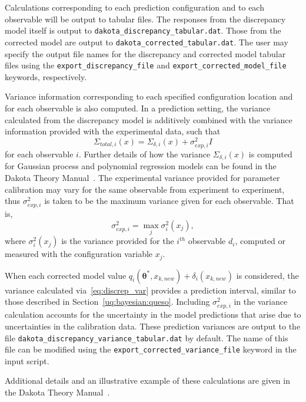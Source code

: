 Calculations corresponding to each prediction configuration and to each
observable will be output to tabular files. The responses from the discrepancy
model itself is output to \texttt{dakota\_discrepancy\_tabular.dat}. Those
from the corrected model are output to \texttt{dakota\_corrected\_tabular.dat}.
The user may specify the output file names for the discrepancy and corrected
model tabular files using the \texttt{export\_discrepancy\_file} and
\texttt{export\_corrected\_model\_file} keywords, respectively. 

Variance information corresponding to each specified configuration location 
and for each observable is also computed. In a prediction setting, the 
variance calculated from the discrepancy model is additively combined with 
the variance information provided with the experimental data, such that
\begin{equation}
\label{eq:discrep_var}
\Sigma_{total,i}(x) = \Sigma_{\delta, i}(x) + \sigma^{2}_{exp,i} I
\end{equation}
for each observable $i$. Further details of how the variance 
$\Sigma_{\delta,i}(x)$ is computed for Gaussian process and polynomial 
regression models can be found in the Dakota Theory Manual~\cite{TheoMan}. The 
experimental variance provided for parameter calibration may vary for the
same observable from experiment to experiment, thus $\sigma^{2}_{exp,i}$ is
taken to be the maximum variance given for each observable. That is,
\begin{equation}
\sigma^2_{exp,i} = \max_{j} \sigma^2_{i}(x_j), 
\end{equation}
where $\sigma^2_{i}(x_j)$ is the variance provided for the $i^{th}$ observable
$d_i$, computed or measured with the configuration variable $x_j$. 

When each corrected model value $q_i(\boldsymbol{\theta}^{*}, x_{k, new}) +
\delta_i(x_{k,new})$ is considered, the variance calculated 
via~\ref{eq:discrep_var} provides a prediction interval, similar to those 
described in Section~\ref{uq:bayesian:queso}. Including $\sigma^{2}_{exp,i}$ 
in the variance calculation accounts for the uncertainty in the model 
predictions that arise due to uncertainties in the calibration data. These
prediction variances are output to the file 
\texttt{dakota\_discrepancy\_variance\_tabular.dat} by default. The name of 
this file can be modified using the \texttt{export\_corrected\_variance\_file} 
keyword in the input script. 

Additional details and an illustrative example of these calculations are given 
in the Dakota Theory Manual~\cite{TheoMan}.

